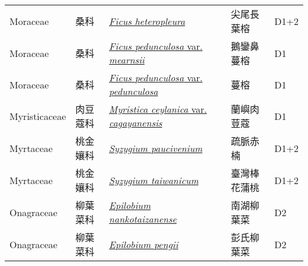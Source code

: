 {\begin{longtable}{L{2.5cm}L{2cm}L{5cm}L{2.5cm}L{3cm}}
    Moraceae & 桑科 & \href{http://www.theplantlist.org/tpl1.1/search?q=Ficus+heteropleura}{\textit{Ficus heteropleura} } & 尖尾長葉榕 & D1+2    \\
    Moraceae & 桑科 & \href{http://www.theplantlist.org/tpl1.1/search?q=Ficus+pedunculosa+var.+mearnsii}{\textit{Ficus pedunculosa} var. \textit{mearnsii} } & 鵝鑾鼻蔓榕 & D1    \\
    Moraceae & 桑科 & \href{http://www.theplantlist.org/tpl1.1/search?q=Ficus+pedunculosa+var.+pedunculosa}{\textit{Ficus pedunculosa} var. \textit{pedunculosa} } & 蔓榕 & D1    \\
    Myristicaceae & 肉豆蔻科 & \href{http://www.theplantlist.org/tpl1.1/search?q=Myristica+ceylanica+var.+cagayanensis}{\textit{Myristica ceylanica} var. \textit{cagayanensis} } & 蘭嶼肉荳蔻 & D1    \\
    Myrtaceae & 桃金孃科 & \href{http://www.theplantlist.org/tpl1.1/search?q=Syzygium+paucivenium}{\textit{Syzygium paucivenium} } & 疏脈赤楠 & D1+2    \\
    Myrtaceae & 桃金孃科 & \href{http://www.theplantlist.org/tpl1.1/search?q=Syzygium+taiwanicum}{\textit{Syzygium taiwanicum} } & 臺灣棒花蒲桃 & D1+2    \\
    Onagraceae & 柳葉菜科 & \href{http://www.theplantlist.org/tpl1.1/search?q=Epilobium+nankotaizanense}{\textit{Epilobium nankotaizanense} } & 南湖柳葉菜 & D2    \\
    Onagraceae & 柳葉菜科 & \href{http://www.theplantlist.org/tpl1.1/search?q=Epilobium+pengii}{\textit{Epilobium pengii} } & 彭氏柳葉菜 & D2    \\

\end{longtable}}
